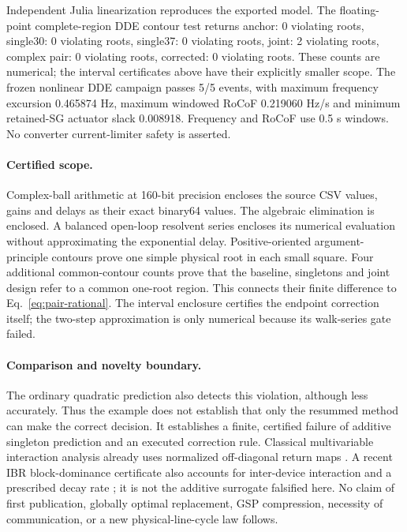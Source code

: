 \documentclass[11pt]{article}
\begin{document}
Independent Julia linearization reproduces the exported model. The floating-point complete-region DDE contour test returns anchor: 0 violating roots, single30: 0 violating roots, single37: 0 violating roots, joint: 2 violating roots, complex pair: 0 violating roots, corrected: 0 violating roots. These counts are numerical; the interval certificates above have their explicitly smaller scope.
The frozen nonlinear DDE campaign passes 5/5 events, with maximum frequency excursion 0.465874 Hz, maximum windowed RoCoF 0.219060 Hz/s and minimum retained-SG actuator slack 0.008918. Frequency and RoCoF use 0.5 s windows. No converter current-limiter safety is asserted.

\paragraph{Certified scope.}
Complex-ball arithmetic at 160-bit precision encloses the source CSV values,
gains and delays as their exact binary64 values. The algebraic elimination
is enclosed. A balanced open-loop resolvent series encloses its numerical
evaluation without approximating the exponential delay. Positive-oriented
argument-principle contours prove one simple physical root in each small
square. Four additional common-contour counts prove that the baseline,
singletons and joint design refer to a common one-root region. This connects
their finite difference to Eq.~\eqref{eq:pair-rational}.
The interval enclosure certifies the endpoint correction itself; the
two-step approximation is only numerical because its walk-series gate failed.

\paragraph{Comparison and novelty boundary.}
The ordinary quadratic prediction also detects this violation, although less
accurately. Thus the example does not establish that only the resummed method
can make the correct decision. It establishes a finite, certified failure
of additive singleton prediction and an executed correction rule.
Classical multivariable interaction analysis already uses normalized
off-diagonal return maps \cite{grosdidier}. A recent IBR block-dominance
certificate also accounts for inter-device interaction and a prescribed
decay rate \cite{chenbdd}; it is not the additive surrogate falsified here.
No claim of first publication, globally optimal replacement, GSP compression,
necessity of communication, or a new physical-line-cycle law follows.
\end{document}
